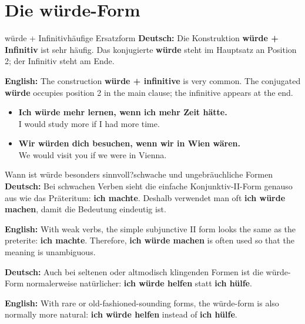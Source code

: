 \documentclass[a4paper,11pt]{article}
\newcommand{\GermanText}[1]{\textbf{Deutsch: }#1\par}
\newcommand{\EnglishText}[1]{{\small\color{SoftGray}\textbf{English: }#1\par}}
\newcommand{\ExampleItem}[2]{\item \textbf{#1}\\{\small\color{SoftGray}#2}}
\begin{document}
    \section{Die würde-Form}

        \begin{grammarentry}{würde + Infinitiv}{häufige Ersatzform}
            \GermanText{Die Konstruktion \textbf{würde + Infinitiv} ist sehr häufig. Das konjugierte \textbf{würde} steht im Hauptsatz an Position 2; der Infinitiv steht am Ende.}
            \EnglishText{The construction \textbf{würde + infinitive} is very common. The conjugated \textbf{würde} occupies position 2 in the main clause; the infinitive appears at the end.}
        \end{grammarentry}

        \begin{exbox}
            \begin{itemize}
                \ExampleItem{Ich würde mehr lernen, wenn ich mehr Zeit hätte.}{I would study more if I had more time.}
                \ExampleItem{Wir würden dich besuchen, wenn wir in Wien wären.}{We would visit you if we were in Vienna.}
            \end{itemize}
        \end{exbox}

        \begin{grammarentry}{Wann ist würde besonders sinnvoll?}{schwache und ungebräuchliche Formen}
            \GermanText{Bei schwachen Verben sieht die einfache Konjunktiv-II-Form genauso aus wie das Präteritum: \textbf{ich machte}. Deshalb verwendet man oft \textbf{ich würde machen}, damit die Bedeutung eindeutig ist.}
            \EnglishText{With weak verbs, the simple subjunctive II form looks the same as the preterite: \textbf{ich machte}. Therefore, \textbf{ich würde machen} is often used so that the meaning is unambiguous.}

            \GermanText{Auch bei seltenen oder altmodisch klingenden Formen ist die würde-Form normalerweise natürlicher: \textbf{ich würde helfen} statt \textbf{ich hülfe}.}
            \EnglishText{With rare or old-fashioned-sounding forms, the würde-form is also normally more natural: \textbf{ich würde helfen} instead of \textbf{ich hülfe}.}
        \end{grammarentry}
\end{document}
